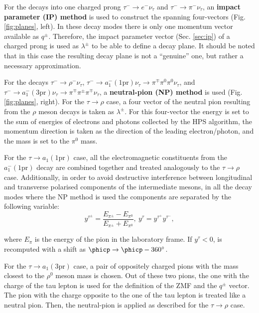 For the decays into one charged prong $\tau^- \to e^- \nu_\tau$ and $\tau^- \to \pi^- \nu_\tau$, an \textbf{impact parameter (IP) method} is used to construct the spanning four-vectors (Fig. \ref{fig:planes}, left). In these decay modes there is only one momentum vector available as $q^\pm$. Therefore, the impact parameter vector (Sec. \ref{sec:ip}) of a charged prong is used as $\lambda^\pm$ to be able to define a decay plane. It should be noted that in this case the resulting decay plane is not a \enquote{genuine} one, but rather a necessary approximation.  

For the decays $\tau^- \to \rho^- \nu_\tau$, $\tau^- \to a_1^-(\text{1pr}) \nu_\tau \to \pi^\mp \pi^0  \pi^0 \nu_\tau$, and $\tau^- \to a_1^-(\text{3pr})\nu_\tau \to \pi^\mp \pi^\pm \pi^\mp \nu_\tau$, a \textbf{neutral-pion (NP) method} is used (Fig. \ref{fig:planes}, right). For the $\tau \to \rho$ case, a four vector of the neutral pion resulting from the $\rho$ meson decays is taken as $\lambda^\pm$. For this four-vector the energy is set to the sum of energies of electrons and photons collected by the HPS algorithm, the momentum direction is taken as the direction of the leading electron/photon, and the mass is set to the $\pi^0$ mass. 

For the $\tau \to a_1(\text{1pr})$ case, all the electromagnetic constituents from the $a_1^-(\text{1pr})$ decay are combined together and treated analogously to the $\tau \to \rho$ case. Additionally, in order to avoid destructive interference between longitudinal and transverse polarised components of the intermediate mesons, in all the decay modes where the NP method is used the components are separated by the following variable:
\begin{equation}
    y^{\tau^\pm} = \dfrac{E_{\pi^\pm} - E_{\pi^0}}{E_{\pi^\pm} + E_{\pi^0}}, ~y^\tau = y^{\tau^+}y^{\tau^-},
\end{equation}

where $E_\pi$ is the energy of the pion in the laboratory frame. If $y^\tau < 0$, \phicp is recomputed with a shift as $\phicp \to \phicp - 360^\circ$.

For the $\tau \to a_1(\text{3pr})$ case, a pair of oppositely charged pions with the mass closest to the $\rho^0$ meson mass is chosen. Out of these two pions, the one with the charge of the tau lepton is used for the definition of the ZMF and the $q^\pm$ vector. The pion with the charge opposite to the one of the tau lepton is treated like a neutral pion. Then, the neutral-pion is applied as described for the $\tau \to \rho$ case. 

